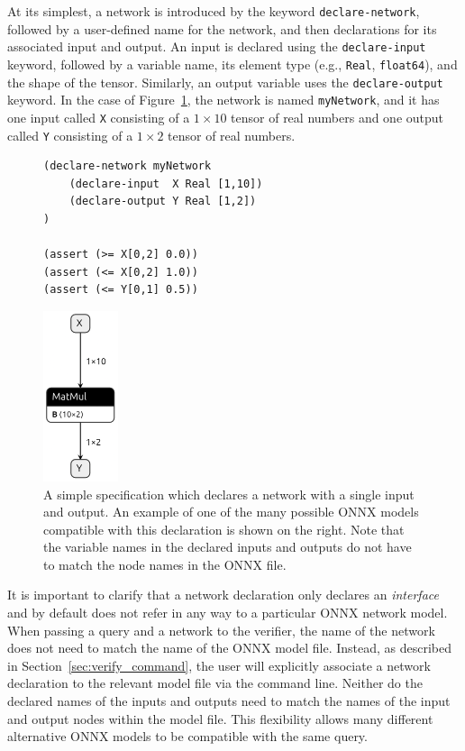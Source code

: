  At its simplest, a network is introduced by the keyword \texttt{declare-network}, followed by a user-defined name for the network, and then declarations for its associated input and output. An input is declared using the \texttt{declare-input} keyword, followed by a variable name, its element type (e.g., \texttt{Real}, \texttt{float64}), 
and the shape of the tensor. Similarly, an output variable uses the \texttt{declare-output} keyword. In the case of Figure~\ref{fig:simple-query}, the network is named \texttt{myNetwork}, and it has one input called \texttt{X} consisting of a $1 \times 10$ tensor of real numbers and one output called \texttt{Y} consisting of a $1 \times 2$ tensor of real numbers. 
\begin{figure}[t]
    \begin{minipage}[c]{0.6\textwidth}
        \begin{lstlisting}[style=lbnf]
(declare-network myNetwork
    (declare-input  X Real [1,10])
    (declare-output Y Real [1,2])
)

(assert (>= X[0,2] 0.0))
(assert (<= X[0,2] 1.0))
(assert (<= Y[0,1] 0.5))\end{lstlisting}
    \end{minipage}%
    \begin{minipage}[c]{0.45\textwidth}
        \centering
        \includegraphics[height=5cm]{imgs/simple_net.onnx.png}
    \end{minipage}
    \caption{A simple \vnnlib{} specification which declares a network with a single input and output. An example of one of the many possible ONNX models compatible with this declaration is shown on the right. Note that the variable names in the declared inputs and outputs do not have to match the node names in the ONNX file.}
    \label{fig:simple-query}
\end{figure}


It is important to clarify that a network declaration only declares an \emph{interface} and by default does not refer in any way to a particular ONNX network model. When passing a query and a network to the verifier, the name of the network does not need to match the name of the ONNX model file. Instead, as described in Section~\ref{sec:verify_command}, the user will explicitly associate a network declaration to the relevant model file via the command line.
Neither do the declared names of the inputs and outputs need to match the names of the input and output nodes within the model file. This flexibility allows many different alternative ONNX models to be compatible with the same query.

